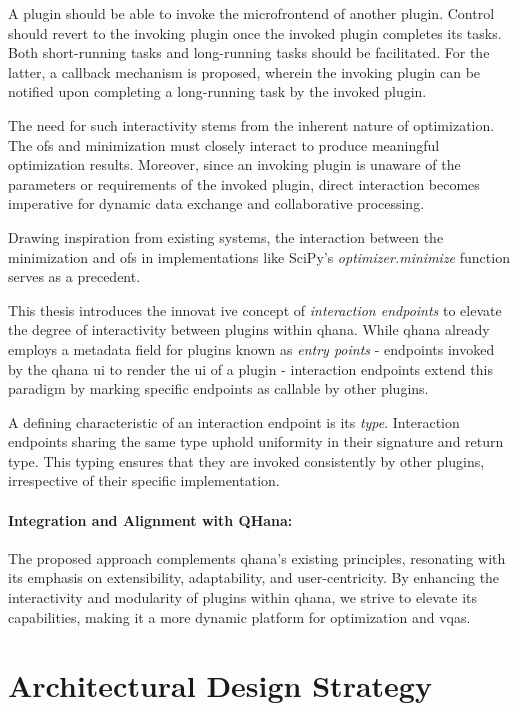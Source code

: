 \documentclass[
  a4paper,  %
  twoside,  %
  bibliography=totoc,
  headsepline,
  cleardoublepage=empty,
  parskip=half,
  draft=false
]{scrbook}
\begin{document}
A plugin should be able to invoke the microfrontend of another plugin.
Control should revert to the invoking plugin once the invoked plugin completes its tasks.
Both short-running tasks and long-running tasks should be facilitated.
For the latter, a callback mechanism is proposed, wherein the invoking plugin can be notified upon completing a long-running task by the invoked plugin.

The need for such interactivity stems from the inherent nature of optimization.
The \glspl{of} and minimization must closely interact to produce meaningful optimization results.
Moreover, since an invoking plugin is unaware of the parameters or requirements of the invoked plugin, direct interaction becomes imperative for dynamic data exchange and collaborative processing.

Drawing inspiration from existing systems, the interaction between the minimization and \glspl{of} in implementations like SciPy's \emph{optimizer.minimize} \cite{Virtanen2020} function serves as a precedent.

This thesis introduces the innovat ive concept of \emph{interaction endpoints} to elevate the degree of interactivity between plugins within \gls{qhana}.
While \gls{qhana} already employs a metadata field for plugins known as \emph{entry points} - endpoints invoked by the \gls{qhana} \gls{ui} to render the \gls{ui} of a plugin - interaction endpoints extend this paradigm by marking specific endpoints as callable by other plugins.

A defining characteristic of an interaction endpoint is its \emph{type}.
Interaction endpoints sharing the same type uphold uniformity in their signature and return type.
This typing ensures that they are invoked consistently by other plugins, irrespective of their specific implementation.

\paragraph{Integration and Alignment with QHana:}
The proposed approach complements \gls{qhana}'s existing principles, resonating with its emphasis on extensibility, adaptability, and user-centricity.
By enhancing the interactivity and modularity of plugins within \gls{qhana}, we strive to elevate its capabilities, making it a more dynamic platform for optimization and \glspl{vqa}.

\section{Architectural Design Strategy}
\label{sec:architecturalDesignStrategy}
\end{document}
